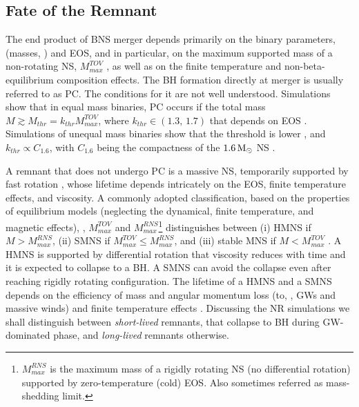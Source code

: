 \subsection{Fate of the Remnant}

The end product of \ac{BNS} merger depends primarily on the binary parameters, (masses, 
\mr{}) and \ac{EOS}, and in particular, on the maximum supported mass of a non-rotating 
\ac{NS}, $M_{max}^{TOV}$ \citep{Shibata:2016}, as well as on the finite temperature and 
non-beta-equilibrium composition effects. 
%
The \ac{BH} formation directly at merger is usually referred to as \ac{PC}. 
The conditions for it  are not well understood. 
Simulations show that in equal mass binaries, \ac{PC} occurs if the total mass 
$M\gtrsim M_{thr} = k_{thr}M_{max}^{TOV}$, where $k_{thr}\in(1.3,\,1.7)$ that depends on 
\ac{EOS} \citep{Shibata:2005ss,Shibata:2006nm,Hotokezaka:2011dh,Bauswein:2013jpa}.
Simulations of unequal mass binaries show that the threshold is lower \citep{Bauswein:2017vtn}, 
and $k_{thr}\propto C_{1.6}$, with $C_{1.6}$ being the compactness of the $1.6\,{\text{M}_{\odot}}$ 
\ac{NS} \citep{Hotokezaka:2011dh,Bauswein:2013jpa,Bauswein:2017vtn}. 

A remnant that does not undergo \ac{PC} is a massive \ac{NS}, temporarily supported 
by fast rotation \citep{Baumgarte:1999cq,Rosswog:2001fh,Shibata:2005ss,Shibata:2006nm,
    Sekiguchi:2011zd,Hotokezaka:2013iia,Bernuzzi:2015opx}, whose lifetime depends 
intricately on the \ac{EOS}, finite temperature effects, and viscosity. A commonly 
adopted classification, based on the properties of equilibrium models (neglecting the 
dynamical, finite temperature, and magnetic effects), \ie, $M_{max}^{TOV}$ and
$M_{max}^{RNS}$\footnote{
    $M_{max}^{RNS}$ is the maximum mass of a rigidly rotating \ac{NS} (no differential 
    rotation) supported by zero-temperature (cold) \ac{EOS}. Also sometimes referred as 
    mass-shedding limit.
}
distinguishes between 
(i) \ac{HMNS} if $M>M_{max}^{RNS}$, 
(ii) \ac{SMNS} if $M_{max}^{TOV} \leq M_{max}^{RNS}$,
and (iii) stable \ac{MNS} if $M < M_{max}^{TOV}$ \citep[\eg][]{Baumgarte:1999cq}.
A \ac{HMNS} is supported by differential rotation that viscosity reduces with time 
and it is expected to collapse to a \ac{BH}. A \ac{SMNS} can avoid the collapse 
even after reaching rigidly rotating configuration. The lifetime of a \ac{HMNS} and 
a \ac{SMNS} depends on the efficiency of mass and angular momentum loss 
(to, \eg, \acp{GW} and massive winds) and finite temperature effects \citep{Radice:2018xqa}. 
%
Discussing the \ac{NR} simulations we shall distinguish between \textit{short-lived} remnants, 
that collapse to \ac{BH} during \ac{GW}-dominated phase, 
and \textit{long-lived} remnants otherwise.

